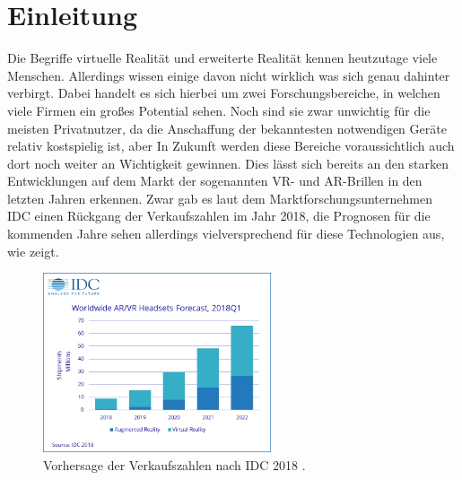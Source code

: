 
\chapter{Einleitung}\label{chapter:introduction}

	
	
	Die Begriffe virtuelle Realität und erweiterte Realität kennen heutzutage viele Menschen. Allerdings wissen einige davon nicht wirklich was sich genau dahinter verbirgt. Dabei handelt es sich hierbei um zwei Forschungsbereiche, in welchen viele Firmen ein großes Potential sehen. Noch sind sie zwar unwichtig für die meisten Privatnutzer, da die Anschaffung der bekanntesten notwendigen Geräte relativ kostspielig ist, aber In Zukunft werden diese Bereiche voraussichtlich auch dort noch weiter an Wichtigkeit gewinnen.
	Dies lässt sich bereits an den starken Entwicklungen auf dem Markt der sogenannten VR- und AR-Brillen in den letzten Jahren erkennen.
	Zwar gab es laut dem Marktforschungsunternehmen IDC einen Rückgang der Verkaufszahlen im Jahr 2018, die Prognosen für die kommenden Jahre sehen allerdings vielversprechend für diese Technologien aus, wie  zeigt.
	
	\begin{figure}[htbp]
		\centering
		\includegraphics[width=0.6\textwidth]{figures/IDC-2018.jpg}
		\caption{Vorhersage der Verkaufszahlen nach IDC 2018 .}
		\label{fig:forecast_diagram}
	\end{figure}
	
